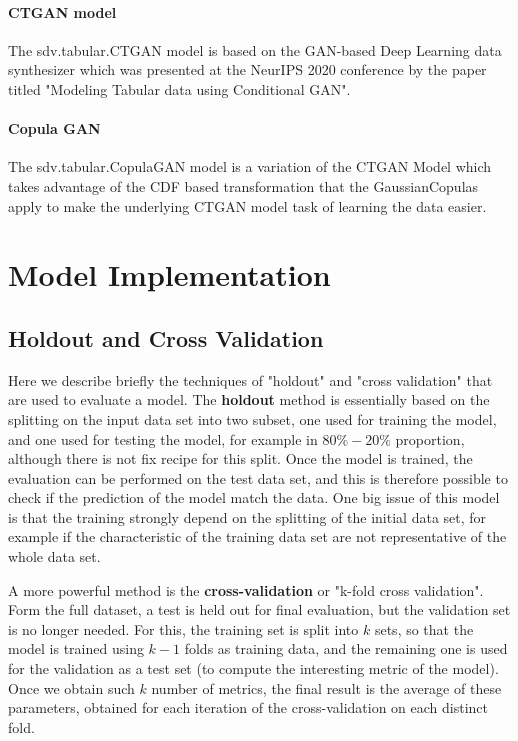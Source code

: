 \documentclass{article}
\begin{document}
\paragraph{CTGAN model}
The sdv.tabular.CTGAN model \cite{ctgan} is based on the GAN-based Deep Learning data synthesizer which was presented at the NeurIPS 2020 conference by the paper titled "Modeling Tabular data using Conditional GAN".
\paragraph{Copula GAN}
The sdv.tabular.CopulaGAN model \cite{copulagan} is a variation of the CTGAN Model which takes advantage of the CDF based transformation that the GaussianCopulas apply to make the underlying CTGAN model task of learning the data easier.

\section{Model Implementation}

\subsection{Holdout and Cross Validation}
Here we describe briefly the techniques of "holdout" and "cross validation" that are used to evaluate a model. The \textbf{holdout} method is essentially based on the splitting on the input data set into two subset, one used for training the model, and one used for testing the model, for example in $80\%-20\%$ proportion, although there is not fix recipe for this split. Once the model is trained, the evaluation can be performed on the test data set, and this is therefore possible to check if the prediction of the model match the data. One big issue of this model is that the training strongly depend on the splitting of the initial data set, for example if the characteristic of the training data set are not representative of the whole data set.

A more powerful method is the \textbf{cross-validation} or "k-fold cross validation". Form the full dataset, a test is held out for final evaluation, but the validation set is no longer needed. For this, the training set is split into $k$ sets, so that the model is trained using $k-1$ folds as training data, and the remaining one is used for the validation as a test set (to compute the interesting metric of the model).
Once we obtain such $k$ number of metrics, the final result is the average of these parameters, obtained for each iteration of the cross-validation on each distinct fold.
\end{document}
